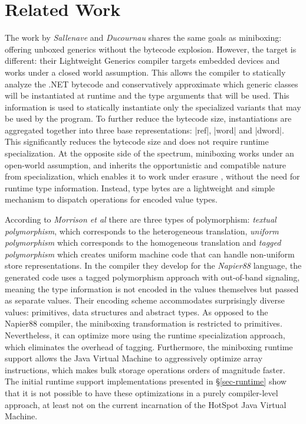 \section{Related Work}
\label{sec-related}

The work by {\em Sallenave} and {\em Ducournau} \cite{lightweight-generics} shares the same goals as miniboxing: offering unboxed generics without the bytecode explosion. However, the target is different: their Lightweight Generics compiler targets embedded devices and works under a closed world assumption. This allows the compiler to statically analyze the .NET bytecode and conservatively approximate which generic classes will be instantiated at runtime and the type arguments that will be used. This information is used to statically instantiate only the specialized variants that may be used by the program. To further reduce the bytecode size, instantiations are aggregated together into three base representations: |ref|, |word| and |dword|. This significantly reduces the bytecode size and does not require runtime specialization. At the opposite side of the spectrum, miniboxing works under an open-world assumption, and inherits the opportunistic and compatible nature from specialization, which enables it to work under erasure \cite{java-erasure}, without the need for runtime type information. Instead, type bytes are a lightweight and simple mechanism to dispatch operations for encoded value types.

According to {\em Morrison et al} \cite{morrison-napier88} there are three types of polymorphism: {\em textual polymorphism}, which corresponds to the heterogeneous translation, {\em uniform polymorphism} which corresponds to the homogeneous translation and {\em tagged polymorphism} which creates uniform machine code that can handle non-uniform store representations. In the compiler they develop for the {\em Napier88} language, the generated code uses a tagged polymorphism approach with out-of-band signaling, meaning the type information is not encoded in the values themselves but passed as separate values. Their encoding scheme accommodates surprisingly diverse values: primitives, data structures and abstract types. As opposed to the Napier88 compiler, the miniboxing transformation is restricted to primitives. Nevertheless, it can optimize more using the runtime specialization approach, which eliminates the overhead of tagging. Furthermore, the miniboxing runtime support allows the Java Virtual Machine to aggressively optimize array instructions, which makes bulk storage operations orders of magnitude faster. The initial runtime support implementations presented in \S\ref{sec-runtime} show that it is not possible to have these optimizations in a purely compiler-level approach, at least not on the current incarnation of the HotSpot Java Virtual Machine.    

